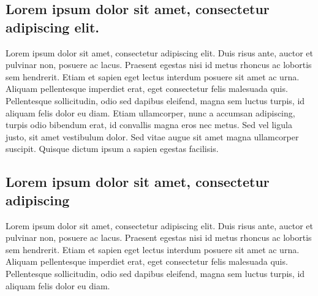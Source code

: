 \documentclass[a4paper,11pt,openany]{book}
\begin{document}
\subsection{Lorem ipsum dolor sit amet, consectetur adipiscing elit.}
Lorem ipsum dolor sit amet, consectetur adipiscing elit. Duis risus ante, auctor et pulvinar non, posuere ac lacus. Praesent egestas nisi id metus rhoncus ac lobortis sem hendrerit. Etiam et sapien eget lectus interdum posuere sit amet ac urna. Aliquam pellentesque imperdiet erat, eget consectetur felis malesuada quis. Pellentesque sollicitudin, odio sed dapibus eleifend, magna sem luctus turpis, id aliquam felis dolor eu diam. Etiam ullamcorper, nunc a accumsan adipiscing, turpis odio bibendum erat, id convallis magna eros nec metus. Sed vel ligula justo, sit amet vestibulum dolor. Sed vitae augue sit amet magna ullamcorper suscipit. Quisque dictum ipsum a sapien egestas facilisis. 

\subsection{Lorem ipsum dolor sit amet, consectetur adipiscing}
Lorem ipsum dolor sit amet, consectetur adipiscing elit. Duis risus ante, auctor et pulvinar non, posuere ac lacus. Praesent egestas nisi id metus rhoncus ac lobortis sem hendrerit. Etiam et sapien eget lectus interdum posuere sit amet ac urna. Aliquam pellentesque imperdiet erat, eget consectetur felis malesuada quis. Pellentesque sollicitudin, odio sed dapibus eleifend, magna sem luctus turpis, id aliquam felis dolor eu diam.
\end{document}
